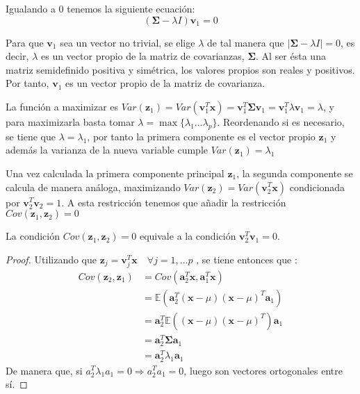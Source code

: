\noindent Igualando a 0 tenemos la siguiente ecuación: 
\begin{equation}
(\mathbf{\Sigma}-\lambda I)\textbf{v}_1=0
\end{equation}

\noindent Para que $\textbf{v}_1$ sea un vector no trivial, se elige $\lambda$ de tal manera que $|\mathbf{\Sigma}-\lambda I| = 0$, es decir, $\lambda$ es un vector propio de la matriz de covarianzas, $\mathbf{\Sigma}$. Al ser ésta una matriz semidefinido positiva y simétrica, los valores propios son reales y positivos. Por tanto, $\textbf{v}_1$ es un vector propio de la matriz de covarianza.

\noindent La función a maximizar es $Var(\textbf{z}_1)=Var(\textbf{v}_1^T\textbf{x})=\textbf{v}_1^T\mathbf{\Sigma} \textbf{v}_1=\textbf{v}_1^T\lambda \textbf{v}_1=\lambda$, y para maximizarla basta tomar $\lambda=\max{\lbrace\lambda_1\ldots \lambda_p\rbrace}$. Reordenando si es necesario, se tiene que $\lambda=\lambda_1$, por tanto la primera componente es el vector propio $\mathbf{z}_1$ y además la varianza de la nueva variable cumple $Var(\mathbf{z}_1)=\lambda_1$ 

\noindent Una vez calculada la primera componente principal $\textbf{z}_1$, la segunda componente se calcula de manera análoga, maximizando $Var(\textbf{z}_2)=Var(\textbf{v}_2^T\textbf{x})$ condicionada por $\textbf{v}_2^T\textbf{v}_2=1$. A esta restricción tenemos que añadir la restricción $Cov(\textbf{z}_1,\textbf{z}_2)=0 $

\begin{propo}
La condición $Cov(\textbf{z}_1,\textbf{z}_2)=0 $ equivale a la condición $\textbf{v}_2^T\textbf{v}_1 = 0$.
\begin{proof}
Utilizando que $\textbf{z}_j=\textbf{v}_j^T \textbf{x}\quad \forall j=1,\ldots p$ , se tiene entonces que :
\begin{align*}
Cov(\textbf{z}_2,\textbf{z}_1)&= Cov (\textbf{a}_2^T\textbf{x},\textbf{a}_1^T\textbf{x})\\ 
&= \mathbb{E}(\textbf{a}_2^T(\textbf{x}-\mu)(\textbf{x}-\mu)^T \textbf{a}_1)\\
&= \textbf{a}_2^T \mathbb{E}((\textbf{x}-\mu)(\textbf{x}-\mu)^T) \textbf{a}_1\\
&= \textbf{a}_2^T \mathbf{\Sigma} \textbf{a}_1 \\
&= \textbf{a}_2^T \lambda_1 \textbf{a}_1
\end{align*}
\noindent De manera que, si $a_2^T \lambda_1 a_1 = 0 \Rightarrow a_2^T a_1=0 $, luego son vectores ortogonales entre sí.
\end{proof}
\end{propo}


